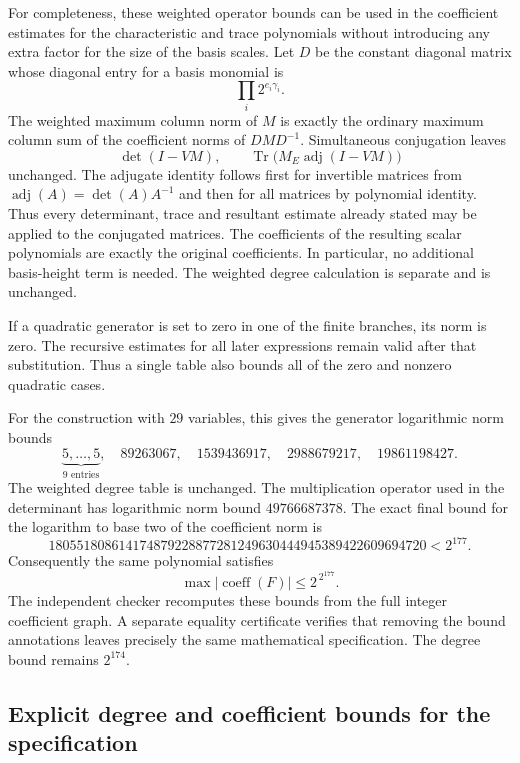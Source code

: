 \documentclass[11pt,a4paper]{article}
\theoremstyle{definition}
\theoremstyle{remark}
\begin{document}
For completeness, these weighted operator bounds can be used in the
coefficient estimates for the characteristic and trace polynomials
without introducing any extra factor for the size of the basis scales.
Let $D$ be the constant diagonal matrix whose diagonal entry for a
basis monomial is
\[
                         \prod_i2^{e_i\gamma_i}.
\]
The weighted maximum column norm of $M$ is exactly the ordinary maximum
column sum of the coefficient norms of $DMD^{-1}$. Simultaneous
conjugation leaves
\[
 \det(I-VM),\qquad
 \operatorname{Tr}\bigl(M_E\operatorname{adj}(I-VM)\bigr)
\]
unchanged. The adjugate identity follows first for invertible matrices
from $\operatorname{adj}(A)=\det(A)A^{-1}$ and then for all matrices
by polynomial identity. Thus every determinant, trace and resultant
estimate already stated may be applied to the conjugated matrices.
The coefficients of the resulting scalar polynomials are exactly the
original coefficients. In particular, no additional basis-height
term is needed. The weighted degree calculation is separate and is
unchanged.

If a quadratic generator is set to zero in one of the finite branches,
its norm is zero. The recursive estimates for all later expressions
remain valid after that substitution. Thus a single table also bounds
all of the zero and nonzero quadratic cases.

For the construction with $29$ variables, this gives the generator
logarithmic norm bounds
\[
 \underbrace{5,\ldots,5}_{9\text{ entries}},\quad
 89263067,\quad1539436917,\quad2988679217,\quad19861198427.
\]
The weighted degree table is unchanged. The multiplication operator
used in the determinant has logarithmic norm bound $49766687378$.
The exact final bound for the logarithm to base two of the coefficient
norm is
\[
 180551808614174879228877281249630444945389422609694720
                                                        <2^{177}.
\]
Consequently the same polynomial satisfies
\[
                    \max|\operatorname{coeff}(F)|\le2^{\,2^{177}}.
\]
The independent checker recomputes these bounds from the full integer
coefficient graph. A separate equality certificate verifies that
removing the bound annotations leaves precisely the same mathematical
specification. The degree bound remains $2^{174}$.
\subsection{Explicit degree and coefficient bounds for the specification}
\label{subsec:finite-algebra-bounds}
\end{document}
